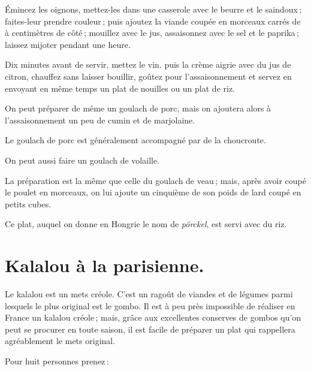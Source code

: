 Émincez les oignons, mettez-les dans une casserole avec le beurre et le
saindoux ; faites-leur prendre couleur ; puis ajoutez la viande coupée en
morceaux carrés de {\mmm} à {\mmm} centimètres de côté ; mouillez avec le jus,
assaisonnez avec le sel et le paprika ; laissez mijoter pendant une heure.

Dix minutes avant de servir, mettez le vin. puis la crème aigrie avec du jus de
citron, chauffez sans laisser bouillir, goûtez pour l'assaisonnement et servez
en envoyant en même temps un plat de nouilles ou un plat de riz.

\sk

On peut préparer de même un goulach de porc, mais on ajoutera alors
à l'assaisonnement un peu de cumin et de marjolaine.

Le goulach de porc est généralement accompagné par de la choucroute.

\sk

On peut aussi faire un goulach de volaille.

La préparation est la même que celle du goulach de veau ; mais, après avoir
coupé le poulet en morceaux, on lui ajoute un cinquième de son poids de lard
coupé en petits cubes.

Ce plat, auquel on donne en Hongrie le nom de \textit{pörckel}, est servi avec
du riz.

\section*{\centering Kalalou à la parisienne.}
{}

Le kalalou est un mets créole. C'est un ragoût de viandes et de légumes parmi
lesquels le plus original est le gombo. Il est à peu près impossible de
réaliser en France un kalalou créole ; mais, grâce aux excellentes conserves de
gombos qu'on peut se procurer en toute saison, il est facile de préparer un
plat qui rappellera agréablement le mets original.

Pour huit personnes prenez :

\medskip

